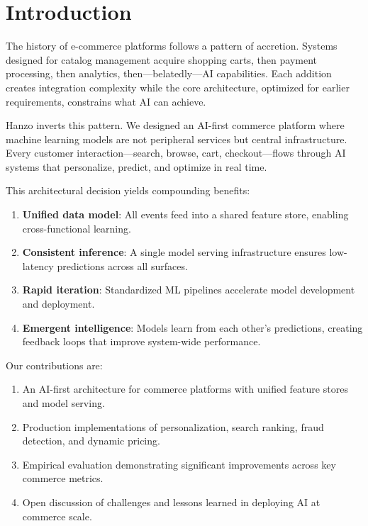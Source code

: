 \section{Introduction}


The history of e-commerce platforms follows a pattern of accretion. Systems designed for catalog management acquire shopping carts, then payment processing, then analytics, then---belatedly---AI capabilities. Each addition creates integration complexity while the core architecture, optimized for earlier requirements, constrains what AI can achieve.

Hanzo inverts this pattern. We designed an AI-first commerce platform where machine learning models are not peripheral services but central infrastructure. Every customer interaction---search, browse, cart, checkout---flows through AI systems that personalize, predict, and optimize in real time.

This architectural decision yields compounding benefits:
\begin{enumerate}
\item \textbf{Unified data model}: All events feed into a shared feature store, enabling cross-functional learning.
\item \textbf{Consistent inference}: A single model serving infrastructure ensures low-latency predictions across all surfaces.
\item \textbf{Rapid iteration}: Standardized ML pipelines accelerate model development and deployment.
\item \textbf{Emergent intelligence}: Models learn from each other's predictions, creating feedback loops that improve system-wide performance.
\end{enumerate}

Our contributions are:
\begin{enumerate}
\item An AI-first architecture for commerce platforms with unified feature stores and model serving.
\item Production implementations of personalization, search ranking, fraud detection, and dynamic pricing.
\item Empirical evaluation demonstrating significant improvements across key commerce metrics.
\item Open discussion of challenges and lessons learned in deploying AI at commerce scale.
\end{enumerate}

